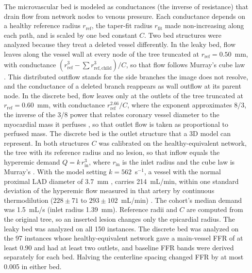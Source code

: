 \documentclass[journal]{IEEEtran}
\begin{document}
The microvascular bed is modeled as conductances (the inverse of resistance) that drain flow from network nodes to
venous pressure. Each conductance depends on a healthy reference radius $r_\mathrm{ref}$, the taper-fit radius
$r_\mathrm{fit}$ made non-increasing along each path, and is scaled by one bed constant $C$. Two bed structures were analyzed because they treat a deleted vessel differently. In the leaky
bed, flow leaves along the vessel wall at every node of the tree truncated at $r_\mathrm{ref} = 0.50$~mm, with
conductance $(r_\mathrm{ref}^3 - \sum r_{\mathrm{ref},\mathrm{child}}^3)/C$, so that flow follows Murray's cube law
\cite{murray1926}. This distributed outflow stands for the side branches the image does not resolve, and the
conductance of a deleted branch reappears as wall outflow at its parent node. In the discrete bed, flow leaves only
at the outlets of the tree truncated at $r_\mathrm{ref} = 0.60$~mm, with conductance $r_\mathrm{ref}^{2.66}/C$,
where the exponent approximates 8/3, the inverse of the 3/8 power that relates coronary vessel diameter to the
myocardial mass it perfuses \cite{choy2008}, so that outlet flow is taken as proportional to perfused mass. The discrete bed is the outlet structure that a 3D model can
represent. In both structures $C$ was calibrated on the healthy-equivalent network, the tree with its reference
radius and no lesion, so that inflow equals the hyperemic demand $Q = k\,r_\mathrm{in}^3$, where $r_\mathrm{in}$ is
the inlet radius and the cube law is Murray's \cite{murray1926}. With the model setting $k = 562$~s$^{-1}$, a
vessel with the normal proximal LAD diameter of 3.7~mm \cite{dodge1992}, carries 214~mL/min,
within one standard deviation of the hyperemic flow measured in that artery by continuous thermodilution
($228 \pm 71$ to $293 \pm 102$~mL/min) \cite{fournier2021}. The cohort's median demand was 1.5~mL/s (inlet radius 1.39~mm). Reference radii and $C$ are computed from the original tree, so an inserted lesion changes
only the epicardial radius. The leaky bed was analyzed on all 150 instances. The discrete bed was analyzed on the
97 instances whose healthy-equivalent network gave a main-vessel FFR of at least 0.90 and had at least two outlets,
and baseline FFR bands were derived separately for each bed. Halving the centerline spacing changed FFR by at most
0.005 in either bed.
\end{document}
